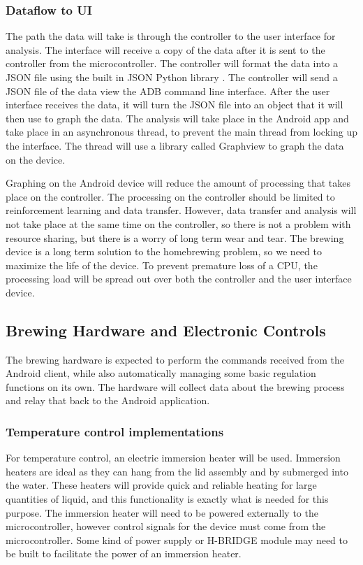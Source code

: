 \documentclass[draftclsnofoot,onecolumn,letterpaper,10pt]{IEEEtran}
\begin{document}
\subsubsection{Dataflow to UI}
The path the data will take is through the controller to the user interface for analysis.
The interface will receive a copy of the data after it is sent to the controller from the microcontroller.
The controller will format the data into a JSON file using the built in JSON Python library \cite{JSONPython}.
The controller will send a JSON file of the data view the ADB command line interface.
After the user interface receives the data, it will turn the JSON file into an object that it will then use to graph the data.
The analysis will take place in the Android app and take place in an asynchronous thread, to prevent the main thread from locking up the interface.
The thread will use a library called Graphview to graph the data on the device. \cite{Graphview}

Graphing on the Android device will reduce the amount of processing that takes place on the controller.
The processing on the controller should be limited to reinforcement learning and data transfer.
However, data transfer and analysis will not take place at the same time on the controller, so there is not a problem with resource sharing, but there is a worry of long term wear and tear.
The brewing device is a long term solution to the homebrewing problem, so we need to maximize the life of the device.
To prevent premature loss of a CPU, the processing load will be spread out over both the controller and the user interface device.

\subsection{Brewing Hardware and Electronic Controls}\label{sec:hardware}%
The brewing hardware is expected to perform the commands received from the Android client, while also automatically managing
some basic regulation functions on its own. The hardware will collect data about the brewing process and relay that back to the
Android application.

\subsubsection{Temperature control implementations}
For temperature control, an electric immersion heater will be used.
Immersion heaters are ideal as they can hang from the lid assembly and by submerged into the water. \cite{immersion}
These heaters will provide quick and reliable heating for large quantities of liquid, and this functionality is exactly what is needed for this purpose.
The immersion heater will need to be powered externally to the microcontroller, however control signals for the device must come from the
	microcontroller.
Some kind of power supply or H-BRIDGE module may need to be built to facilitate the power of an immersion heater.
\end{document}
